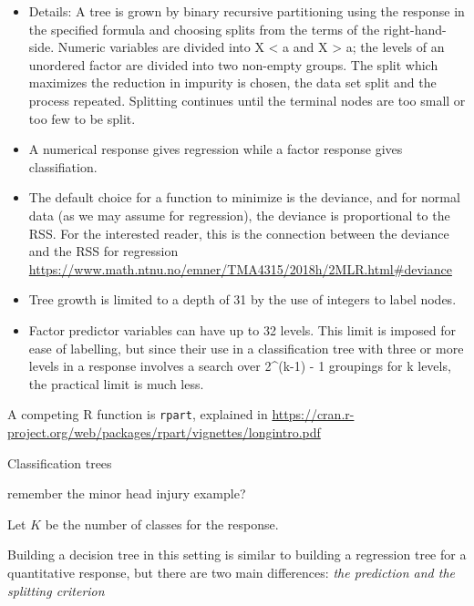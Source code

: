 \documentclass[ignorenonframetext,]{beamer}
\providecommand{\tightlist}{%
  \setlength{\itemsep}{0pt}\setlength{\parskip}{0pt}}
\begin{document}
\begin{frame}

\begin{itemize}
\tightlist
\item
  Details: A tree is grown by binary recursive partitioning using the
  response in the specified formula and choosing splits from the terms
  of the right-hand-side. Numeric variables are divided into X
  \textless{} a and X \textgreater{} a; the levels of an unordered
  factor are divided into two non-empty groups. The split which
  maximizes the reduction in impurity is chosen, the data set split and
  the process repeated. Splitting continues until the terminal nodes are
  too small or too few to be split.
\item
  A numerical response gives regression while a factor response gives
  classifiation.
\item
  The default choice for a function to minimize is the deviance, and for
  normal data (as we may assume for regression), the deviance is
  proportional to the RSS. For the interested reader, this is the
  connection between the deviance and the RSS for regression
  \url{https://www.math.ntnu.no/emner/TMA4315/2018h/2MLR.html\#deviance}
\end{itemize}

\end{frame}

\begin{frame}[fragile]

\begin{itemize}
\tightlist
\item
  Tree growth is limited to a depth of 31 by the use of integers to
  label nodes.
\item
  Factor predictor variables can have up to 32 levels. This limit is
  imposed for ease of labelling, but since their use in a classification
  tree with three or more levels in a response involves a search over
  2\^{}(k-1) - 1 groupings for k levels, the practical limit is much
  less.
\end{itemize}

A competing R function is \texttt{rpart}, explained in
\url{https://cran.r-project.org/web/packages/rpart/vignettes/longintro.pdf}

\end{frame}

\begin{frame}

\begin{block}{Classification trees}

remember the minor head injury example?

Let \(K\) be the number of classes for the response.

Building a decision tree in this setting is similar to building a
regression tree for a quantitative response, but there are two main
differences: \emph{the prediction and the splitting criterion}

\end{block}

\end{frame}
\end{document}
